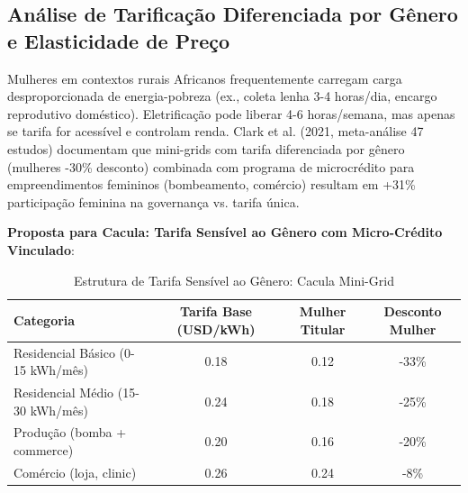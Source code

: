 \documentclass[12pt, a4paper]{article}
\begin{document}
\subsection{Análise de Tarificação Diferenciada por Gênero e Elasticidade de Preço}

Mulheres em contextos rurais Africanos frequentemente carregam carga desproporcionada de energia-pobreza (ex., coleta lenha 3-4 horas/dia, encargo reprodutivo doméstico). Eletrificação pode liberar 4-6 horas/semana, mas apenas se tarifa for acessível e controlam renda. Clark et al. (2021, meta-análise 47 estudos) documentam que mini-grids com tarifa diferenciada por gênero (mulheres -30\% desconto) combinada com programa de microcrédito para empreendimentos femininos (bombeamento, comércio) resultam em +31\% participação feminina na governança vs. tarifa única.

\textbf{Proposta para Cacula: Tarifa Sensível ao Gênero com Micro-Crédito Vinculado}:

\begin{table}[H]
\centering
\caption{Estrutura de Tarifa Sensível ao Gênero: Cacula Mini-Grid}
\label{tab:gender_tariff}
\small
\begin{tabular}{lccc}
\toprule
\rowcolor{LightBlue}\textbf{Categoria} & \textbf{Tarifa Base (USD/kWh)} & \textbf{Mulher Titular} & \textbf{Desconto Mulher} \\
\midrule
Residencial Básico (0-15 kWh/mês) & 0.18 & 0.12 & -33\% \\
Residencial Médio (15-30 kWh/mês) & 0.24 & 0.18 & -25\% \\
Produção (bomba + commerce) & 0.20 & 0.16 & -20\% \\
Comércio (loja, clinic) & 0.26 & 0.24 & -8\% \\
\bottomrule
\end{tabular}
\end{table}
\end{document}
